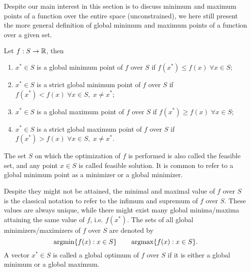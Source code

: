 \documentclass[10pt,a4paper]{article}
\begin{document}
Despite our main interest in this section is to discuss minimum and maximum points of a function over the entire space (unconstrained), we here still present the more general definition of global minimum and maximum points of a function over a given set. 
\begin{definition} 
	Let $f:S\to \mathbb{R}$, then
	\begin{enumerate}
		\item $x^* \in S$ is a global minimum point of $f$ over $S$ if $f(x^*)\leq f(x) \;\forall x \in S$;
		\item $x^* \in S$ is a strict global minimum point of $f$ over $S$ if $f(x^*)< f(x) \;\forall x \in S,\; x\neq x^*$;
		\item $x^* \in S$ is a global maximum point of $f$ over $S$ if $f(x^*)\geq f(x) \;\forall x \in S$;
		\item $x^* \in S$ is a strict global maximum point of $f$ over $S$ if $f(x^*)> f(x) \;\forall x \in S,\; x\neq x^*$.
	\end{enumerate}
\end{definition}
The set $S$ on which the optimization of $f$ is performed is also called the feasible set, and any point $x \in S$ is called feasible solution. It is common to refer to a global minimum point as a minimizer or a global minimizer.
\par Despite they might not be attained, the minimal and maximal value of $f$ over $S$ is the classical notation to refer to the infimum and supremum of $f$ over $S$. These values are always unique, while there might exist many global minima/maxima attaining the same value of $f$, i.e. $f(x^*)$. The sets of all global minimizers/maximizers of $f$ over $S$ are denoted by
\begin{equation*}
	\operatorname*{argmin} \{f(x): x\in S\}\qquad \operatorname*{argmax} \{f(x): x\in S\}.
\end{equation*}
A vector $x^* \in S$ is called a global optimum of $f$ over $S$ if it is either a global minimum or a global maximum.
\end{document}

